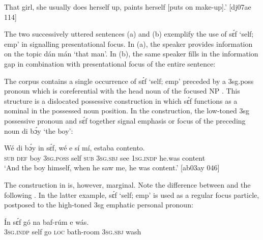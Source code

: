 \glt 
That girl, she usually does herself up, paints herself [puts on make-up].’ [dj07ae 114]
\z

The two successively uttered sentences (a) and (b) exemplify the use of sɛ́f ‘self; emp’ in signalling presentational focus{\fff}. In (a), the speaker provides information on the topic dán mán ‘that man’. In (b), the same speaker fills in the information gap in combination with presentational focus of the entire sentence: 


\ea%
    \label{ex:key:663}
\z\z

The corpus contains a single occurrence of sɛ́f ‘self; emp’ preceded by a 3sg.poss pronoun which is coreferential with the head noun of the focused NP . This structure is a dislocated possessive construction{\fff} in which sɛ́f functions as a nominal in the possessed noun position. In the construction, the low-toned 3sg possessive pronoun and sɛ́f together signal emphasis or focus of the preceding noun di bɔ́y ‘the boy’:


\ea%
    \label{ex:key:664}
    \gll Wé  di  bɔ́y  in    sɛ́f,  wé  e    sí  mí,
estaba  contento.\\
\textsc{sub}  \textsc{def}  boy  \textsc{3sg.poss}  self  \textsc{sub}  \textsc{3sg.sbj}  see  \textsc{1sg.indp}
he.was  content\\

\glt ‘And the boy himself, when he saw me, he was content.’ [ab03ay 046]
\z

The construction in  is, however, marginal. Note the difference between  and the following . In the latter example, sɛ́f ‘self; emp’ is used as a regular focus particle, postposed to the high-toned 3sg emphatic personal pronoun: 


\ea%
    \label{ex:key:665}
    \gll \'{I}n    sɛ́f  gó  na  baf-rúm    e    wás.\\
\textsc{3sg.indp}  self  go  \textsc{loc}  bath-room  \textsc{3sg.sbj}  wash\\

